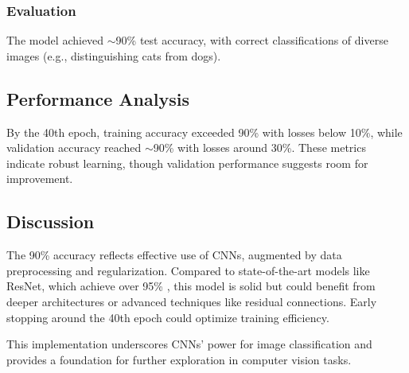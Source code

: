 \documentclass[UTF8]{report}
\theoremstyle{MyLineTheoremStyle} %
\theoremstyle{MyBlockTheoremStyle} %
\theoremstyle{MySubsubsectionStyle} %
\begin{document}
\subsubsection{Evaluation}

The model achieved $\sim$90\% test accuracy, with correct classifications of diverse images (e.g., distinguishing cats from dogs).

\subsection{Performance Analysis}

By the 40th epoch, training accuracy exceeded 90\% with losses below 10\%, while validation accuracy reached $\sim$90\% with losses around 30\%. These metrics indicate robust learning, though validation performance suggests room for improvement.



\subsection{Discussion}

The 90\% accuracy reflects effective use of CNNs, augmented by data preprocessing and regularization. Compared to state-of-the-art models like ResNet, which achieve over 95\% \cite{resnet}, this model is solid but could benefit from deeper architectures or advanced techniques like residual connections. Early stopping around the 40th epoch could optimize training efficiency.

This implementation underscores CNNs’ power for image classification and provides a foundation for further exploration in computer vision tasks.
\end{document}

